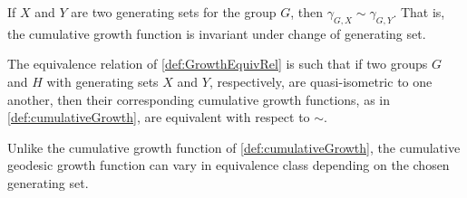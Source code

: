 \begin{proposition}
\label{prop:GrowthInvariant}
If $X$ and $Y$ are two generating sets for the group $G$, then $ \gamma_{G,X} \sim \gamma_{G,Y} $.
That is, the cumulative growth function is invariant under change of generating set.
\end{proposition}

\begin{remark}
	The equivalence relation of \cref{def:GrowthEquivRel} is such that if two groups $G$ and $H$ with generating sets $X$ and $Y$, respectively, are quasi-isometric to one another, then their corresponding cumulative growth functions, as in \cref{def:cumulativeGrowth}, are equivalent with respect to $\sim$.
	\thmendmark
\end{remark}

Unlike the cumulative growth function of \cref{def:cumulativeGrowth}, the cumulative geodesic growth function can vary in equivalence class depending on the chosen generating set.

